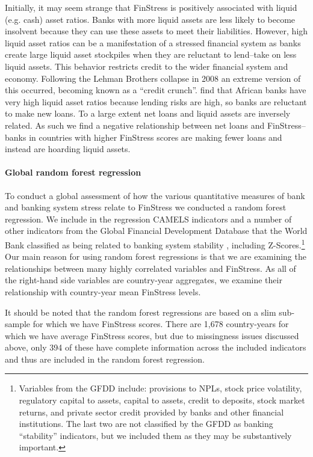 \documentclass[]{article}
\begin{document}
Initially, it may seem strange that FinStress is positively associated with liquid (e.g. cash) asset ratios. Banks with more liquid assets are less likely to become insolvent because they can use these assets to meet their liabilities. However, high liquid asset ratios can be a manifestation of a stressed financial system as banks create large liquid asset stockpiles when they are reluctant to lend--take on less liquid assets. This behavior restricts credit to the wider financial system and economy. Following the Lehman Brothers collapse in 2008 an extreme version of this occurred, becoming known as a ``credit crunch''. \cite{Andrianova2014} find that African banks have very high liquid asset ratios because lending risks are high, so banks are reluctant to make new loans. To a large extent net loans and liquid assets are inversely related. As such we find a negative relationship between net loans and FinStress--banks in countries with higher FinStress scores are making fewer loans and instead are hoarding liquid assets.

\paragraph{Global random forest regression}

To conduct a global assessment of how the various quantitative measures of bank and banking system stress relate to FinStress we conducted a random forest regression. We include in the regression CAMELS indicators and a number of other indicators from the Global Financial Development Database that the World Bank classified as being related to banking system stability \citep{worldbank2015}, including Z-Scores.\footnote{Variables from the GFDD include: provisions to NPLs, stock price volatility, regulatory capital to assets, capital to assets, credit to deposits, stock market returns, and private sector credit provided by banks and other financial institutions. The last two are not classified by the GFDD as banking ``stability'' indicators, but we included them as they may be substantively important.} Our main reason for using random forest regressions is that we are examining the relationships between many highly correlated variables and FinStress. As all of the right-hand side variables are country-year aggregates, we examine their relationship with country-year mean FinStress levels.

It should be noted that the random forest regressions are based on a slim sub-sample for which we have FinStress scores. There are 1,678 country-years for which we have average FinStress scores, but due to missingness issues discussed above, only 394 of these have complete information across the included indicators and thus are included in the random forest regression.
\end{document}
